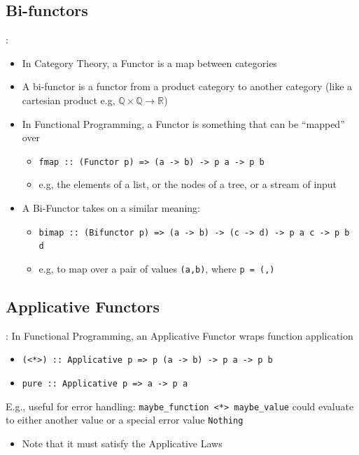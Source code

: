 \documentclass[logoontitle,tabu,supertabular,aspectratio=43]{preney-uwindsor-beamer}
\begin{document}
    \subsection{Bi-functors}
    \begin{frame}{\insertsection: \insertsubsection}
        \begin{itemize}
            \item In Category Theory, a Functor is a map between categories
            \item A bi-functor is a functor from a product category to another category (like a cartesian product e.g, $\mathbb{Q} \times \mathbb{Q} \rightarrow \mathbb{R}$)
            \item In Functional Programming, a Functor is something that can be ``mapped'' over
            \begin{itemize}
                \item \texttt{fmap :: (Functor p) => (a -> b) -> p a -> p b}
                \item e.g, the elements of a list, or the nodes of a tree, or a stream of input
            \end{itemize}
            \item A Bi-Functor takes on a similar meaning:
            \begin{itemize}
                \item \texttt{bimap :: (Bifunctor p) => (a -> b) -> (c -> d) -> p a c -> p b d}
                \item e.g, to map over a pair of values \texttt{(a,b)}, where \texttt{p = (,)}
            \end{itemize}
        \end{itemize}
    \end{frame}

    \subsection{Applicative Functors}
    \begin{frame}{\insertsection: \insertsubsection}
            In Functional Programming, an Applicative Functor wraps function application
            \begin{itemize}
                \item \texttt{(<*>) :: Applicative p => p (a -> b) -> p a -> p b}
                \item \texttt{pure :: Applicative p => a -> p a}
            \end{itemize}
            E.g., useful for error handling:
            \texttt{maybe\_function <*> maybe\_value} could evaluate to either another value or a special error value \texttt{Nothing}
            \begin{itemize}
                \item Note that it must satisfy the Applicative Laws
            \end{itemize}
    \end{frame}
\end{document}
